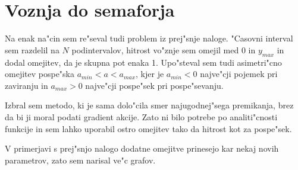 \documentclass[a4paper,10pt]{article}
\newcommand{\naboji}[1]{
  
\begin{figure}
  \subfigure{}
  \subfigure{}\\
  \subfigure{}
  \subfigure{}
\end{figure}

}
\begin{document}
\naboji{10}
\naboji{5}

\section{Voznja do semaforja}
Na enak na"cin sem re"seval tudi problem iz prej"snje naloge. "Casovni interval sem razdelil na $N$ podintervalov, hitrost vo"znje sem omejil med 0 in $y_{max}$ in dodal omejitev, da je skupna pot enaka 1. Upo"steval sem tudi asimetri"cno omejitev pospe"ska $a_{min} < a < a_{max}$, kjer je $a_{min}<0$ najve"cji pojemek pri zaviranju in $a_{max} > 0$ najve"cji pospe"sek pri pospe"sevanju. 

Izbral sem metodo, ki je sama dolo"cila smer najugodnej"sega premikanja, brez da bi ji moral podati gradient akcije. Zato ni bilo potrebe po analiti"cnosti funkcije in sem lahko uporabil ostro omejitev tako da hitrost kot za pospe"sek. 

V primerjavi s prej"snjo nalogo dodatne omejitve prinesejo kar nekaj novih parametrov, zato sem narisal ve"c grafov. 
\end{document}
